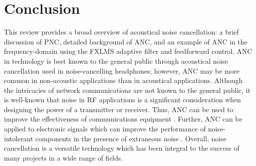 \documentclass[11pt, letterpaper]{article}
\numberwithin{equation}{section}
\begin{document}
\section{Conclusion}

This review provides a broad overview of acoustical noise cancellation: a brief discussion of PNC, detailed background of ANC, and an example of ANC in the frequency-domain using the FXLMS adaptive filter and feedforward control. ANC in technology is best known to the general public through acoustical noise cancellation used in noise-cancelling headphones; however, ANC may be more common in non-acoustic applications than in acoustical applications. Although the intricacies of network communications are not known to the general public, it is well-known that noise in RF applications is a significant consideration when designing the power of a transmitter or receiver. Thus, ANC can be used to improve the effectiveness of communications equipment \cite{darabi}. Further, ANC can be applied to electronic signals which can improve the performance of noise-intolerant components in the presence of extraneous noise \cite{teoh}. Overall, noise cancellation is a versatile technology which has been integral to the success of many projects in a wide range of fields.

\newpage

\printbibliography[heading=bibintoc]
\end{document}
